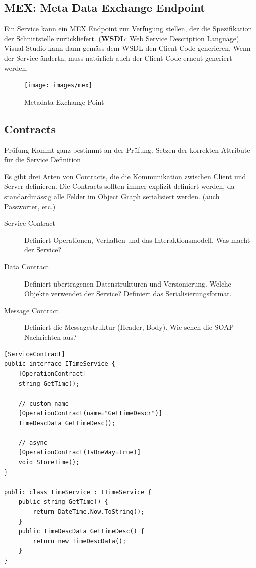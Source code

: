 \subsection{MEX: Meta Data Exchange Endpoint}
Ein Service kann ein MEX Endpoint zur Verfügung stellen, der die Spezifikation der Schnittstelle zurückliefert. (\textbf{WSDL}: Web Service Description Language). Visual Studio kann dann gemäss dem WSDL den Client Code generieren. Wenn der Service ändertn, muss natürlich auch der Client Code erneut generiert werden.

\begin{figure}[h!]
\centering
\texttt{[image: images/mex]}
\caption{Metadata Exchange Point}
\label{fig:mex}
\end{figure}


\clearpage

\subsection{Contracts}
\begin{hint}{Prüfung}{}
	Kommt ganz bestimmt an der Prüfung. Setzen der korrekten Attribute für die Service Definition
\end{hint}
Es gibt drei Arten von Contracts, die die Kommunikation zwischen Client und Server definieren. Die Contracts sollten immer explizit definiert werden, da standardmässig alle Felder im Object Graph serialisiert werden. (auch Passwörter, etc.)
\begin{description}
	\item[Service Contract] Definiert Operationen, Verhalten und das Interaktionsmodell. Was macht der Service?
	\item[Data Contract] Definiert übertragenen Datenstrukturen und Versionierung. Welche Objekte verwendet der Service? Definiert das Serialisierungsformat.
	\item[Message Contract] Definiert die Messagestruktur (Header, Body). Wie sehen die SOAP Nachrichten aus?
\end{description}
\begin{lstlisting}[caption=Service Contract]
[ServiceContract]
public interface ITimeService {
	[OperationContract]
	string GetTime();

	// custom name
	[OperationContract(name="GetTimeDescr")]
	TimeDescData GetTimeDesc();
	
	// async
	[OperationContract(IsOneWay=true)]
	void StoreTime();
}

public class TimeService : ITimeService {
	public string GetTime() { 
		return DateTime.Now.ToString(); 
	}
	public TimeDescData GetTimeDesc() { 
		return new TimeDescData();
	}
}
\end{lstlisting}

